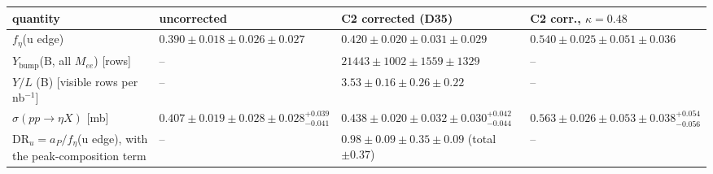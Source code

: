 \begin{tabular}{llll}
\hline
 quantity & uncorrected & C2 corrected (D35) & C2 corr., $\kappa=0.48$ \\
\hline
 $f_\eta$(u edge) & $0.390\pm0.018\pm0.026\pm0.027$ & $0.420\pm0.020\pm0.031\pm0.029$ & $0.540\pm0.025\pm0.051\pm0.036$ \\
 $Y_{\mathrm{bump}}$(B, all $M_{ee}$) [rows] & -- & $21443\pm1002\pm1559\pm1329$ & -- \\
 $Y/L$ (B) [visible rows per nb$^{-1}$] & -- & $3.53\pm0.16\pm0.26\pm0.22$ & -- \\
 $\sigma(pp\to\eta X)$ [mb] & $0.407\pm0.019\pm0.028\pm0.028^{+0.039}_{-0.041}$ & $0.438\pm0.020\pm0.032\pm0.030^{+0.042}_{-0.044}$ & $0.563\pm0.026\pm0.053\pm0.038^{+0.054}_{-0.056}$ \\
 DR$_u=a_P/f_\eta$(u edge), with the peak-composition term & -- & $0.98\pm0.09\pm0.35\pm0.09$ (total $\pm0.37$) & -- \\
\hline
\end{tabular}
